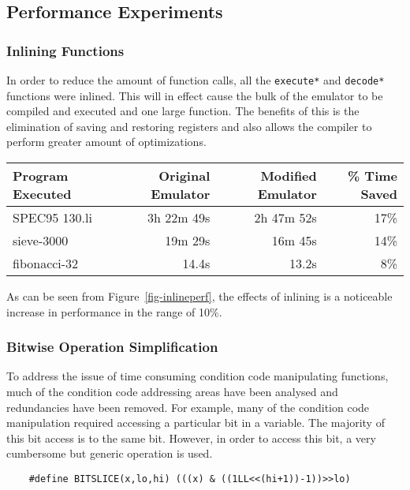 \subsection{Performance Experiments}

\subsubsection{Inlining Functions}
In order to reduce the amount of function calls, all the \verb!execute*!
and \verb!decode*! functions were inlined. This will in effect cause the
bulk of the emulator to be compiled and executed and one large function.
The benefits of this is the elimination of saving and restoring registers
and also allows the compiler to perform greater amount of optimizations.

\centerfigbegin
{
\begin{tabular}{|l|r|r|r|} \hline
Program Executed	& Original Emulator 	& Modified Emulator & \% Time Saved \\ \hline
SPEC95 130.li		& 3h 22m 49s 	& 2h 47m 52s 	& 17\% \\
sieve-3000 		& 19m 29s	& 16m 45s 	& 14\% \\
fibonacci-32		& 14.4s 	& 13.2s 	& 8\%  \\
\hline
\end{tabular}
}

As can be seen from Figure~\ref{fig-inlineperf}, the effects of inlining
is a noticeable increase in performance in the range of 10\%.


\subsubsection*{Bitwise Operation Simplification}

To address the issue of time consuming condition code manipulating
functions, much of the condition code addressing areas have been analysed
and redundancies have been removed. For example, many of the condition
code manipulation required accessing a particular bit in a variable. The
majority of this bit access is to the same bit. However, in order to
access this bit, a very cumbersome but generic operation is used.

\begin{verbatim}
    #define BITSLICE(x,lo,hi) (((x) & ((1LL<<(hi+1))-1))>>lo)
\end{verbatim}

